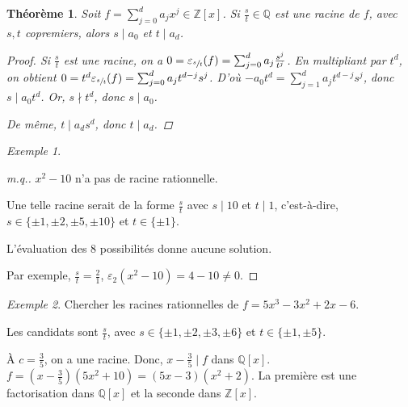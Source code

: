 \documentclass{report}
\newtheorem*{thm}{Th\'eor\`eme}
\theoremstyle{definition}
\theoremstyle{remark}
\newtheorem*{exem}{Exemple}
\newenvironment*{subproof}[1][D\'emonstration]
{
\begin{proof}[#1]

}
{
\renewcommand{\qedsymbol}{$\blacksquare$}
\end{proof}
\renewcommand{\qedsymbol}{$\square$}
}
\def\ZZ{\mathbb{Z}}
\def\QQ{\mathbb{Q}}
\begin{document}
	\begin{thm}
		Soit $f=\sum_{j=0}^{d}a_jx^j\in\ZZ[x]$. \emph{Si} $\frac{s}{t}\in\QQ$ est une racine de $f$, avec $s,t$ copremiers, alors $s\mid a_0$ et $t\mid a_d$.

		\begin{proof}
			Si $\frac{s}{t}$ est une racine, on a $0 = \varepsilon_{\sfrac{s}{t}}(f) = \sum_{j=0}^{d} a_j \frac{s^j}{t^j}$. En multipliant par $t^d$, on obtient $0 = t^d\varepsilon_{\sfrac{s}{t}}(f) = \sum_{j=0}^{d} a_jt^{d-j}s^j$. D'o\`u $-a_0t^d = \sum_{j=1}^{d} a_jt^{d-j}s^j$, donc $s\mid a_0t^d$. Or, $s\nmid t^d$, donc $s\mid a_0$.

			De m\^eme, $t\mid a_ds^d$, donc $t\mid a_d$.
		\end{proof}
	\end{thm}

	\begin{exem}
		\begin{subproof}[m.q.]
			$x^2-10$ n'a pas de racine rationnelle.

			Une telle racine serait de la forme $\frac{s}{t}$ avec $s\mid10$ et $t\mid1$, c'est-\`a-dire, $s\in\{\pm1,\pm2,\pm5,\pm10\}$ et $t\in\{\pm1\}$.

			L'\'evaluation des 8 possibilit\'es donne aucune solution.

			Par exemple, $\frac{s}{t}=\frac{2}{1}$, $\varepsilon_2(x^2-10)=4-10\neq0$.
		\end{subproof}
	\end{exem}

	\begin{exem}
		Chercher les racines rationnelles de $f=5x^3-3x^2+2x-6$.

		Les candidats sont $\frac{s}{t}$, avec $s\in\{\pm1,\pm2,\pm3,\pm6\}$ et $t\in\{\pm1,\pm5\}$.

		\`A $c=\frac{3}{5}$, on a une racine. Donc, $x-\frac{3}{5} \mid f$ dans $\QQ[x]$. $f = \left( x-\frac{3}{5} \right) (5x^2+10) = (5x-3) (x^2+2)$. La premi\`ere est une factorisation dans $\QQ[x]$ et la seconde dans $\ZZ[x]$.
	\end{exem}
\end{document}
